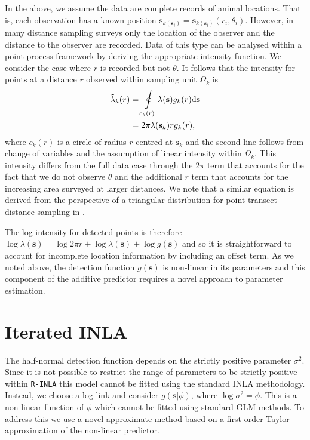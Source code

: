 \documentclass{stylefile16/statsoc}
\newcommand{\bs}{\mathbf{s}}
\newcommand{\tl}{\tilde{\lambda}}   %
\begin{document}
In the above, we assume the data are complete records of animal locations.  That is, each observation has a known position $\bs_{k(\bs_i)} = \bs_{k(\bs_i)}(r_i, \theta_i)$.  However, in many distance sampling surveys only the location of the observer and the distance to the observer are recorded.  Data of this type can be analysed within a point process framework by deriving the appropriate intensity function.  We consider the case where $r$ is recorded but not $\theta$.  It follows that the intensity for points at a distance $r$ observed within sampling unit $\Omega_k$ is
\begin{align}
\label{intensity-incomplete}
\tl_k(r) &= \oint\displaylimits_{c_k(r)} \lambda(\bs)g_k(r)\mathrm{d}\bs \nonumber \\
&= 2\pi\lambda(\bs_k)rg_k(r),
\end{align}
where $c_k(r)$ is a circle of radius $r$ centred at $\bs_k$ and the second line follows from change of variables and the assumption of linear intensity within $\Omega_k$.  This intensity differs from the full data case through the $2\pi$  term that accounts for the fact that we do not observe $\theta$ and the additional $r$ term that accounts for the increasing area surveyed at larger distances.  We note that a similar equation is derived from the perspective of a triangular distribution for point transect distance sampling in \cite{buckland_advanced_2004}.  

The log-intensity for detected points is therefore $\log\tl(\bs) = \log 2 \pi r + \log\lambda(\bs) + \log g(\bs)$ and so it is straightforward to account for incomplete location information by including an offset term.  As we noted above, the detection function $g(\bs)$ is non-linear in its parameters and this component of the additive predictor requires a novel approach to parameter estimation.

\section{Iterated INLA}
\label{sec-iinla}

The half-normal detection function depends on the strictly positive parameter $\sigma^2$. Since it is not possible to restrict the range of parameters to be strictly positive within \texttt{R-INLA} this model cannot be fitted using the standard INLA methodology.  Instead, we choose a log link and consider $g(\bs | \phi)$, where $\log\sigma^2 = \phi$. This is a non-linear function of $\phi$ which cannot be fitted using standard GLM methods.  To address this we use a novel approximate method based on a first-order Taylor approximation of the non-linear predictor.  
\end{document}

